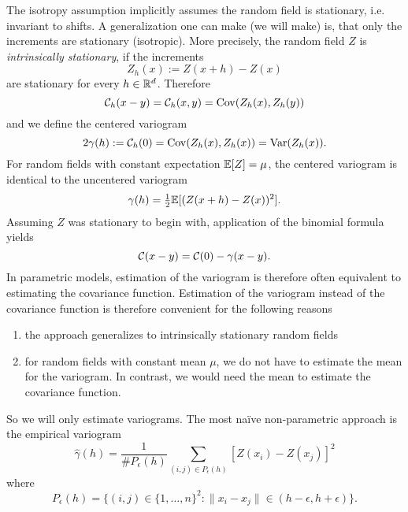 The isotropy assumption implicitly assumes the random field is stationary,
i.e. invariant to shifts. A generalization one can make (we will make)
is, that only the increments are stationary (isotropic). More precisely, the
random field \(Z\) is \emph{intrinsically stationary}, if the increments
\[
	Z_h(x) := Z(x+h) - Z(x)
\]
are stationary for every \(h\in\mathbb{R}^d\). Therefore
\[
	\mathcal{C}_h(x-y) = \mathcal{C}_h(x,y) = \operatorname{Cov}(Z_h(x), Z_h(y))
\]
and we define the centered variogram
\[
	2\gamma(h):= \mathcal{C}_h(0) = \operatorname{Cov}(Z_h(x), Z_h(x))= \operatorname{Var}(Z_h(x)).
\]
For random fields with constant expectation \(\mathbb{E}[Z]=\mu\), the centered
variogram is identical to the uncentered variogram
\[
	\gamma(h) = \tfrac12\mathbb{E}[(Z(x+h)-Z(x))^2].
\]
Assuming \(Z\) was stationary to begin with, application of the binomial formula
yields
\[
	\mathcal{C}(x-y) = \mathcal{C}(0) - \gamma(x-y).
\]
In parametric models, estimation of the variogram is therefore often equivalent
to estimating the covariance function. Estimation of the variogram instead of
the covariance function is therefore convenient for the following reasons
\begin{enumerate}
	\item the approach generalizes to intrinsically stationary random fields
	\item for random fields with constant mean \(\mu\), we do not have to
	estimate the mean for the variogram. In contrast, we would need the mean
	to estimate the covariance function.
\end{enumerate}
So we will only estimate variograms. The most naïve non-parametric approach
is the empirical variogram
\[
	\hat{\gamma}(h) = \frac{1}{\# P_\epsilon(h)}\sum_{(i,j)\in P_\epsilon(h)} [Z(x_i)-Z(x_j)]^2
\]
where
\[
	P_\epsilon(h)
	= \bigl\{
		(i,j)\in \{1,\dots,n\}^2 : \|x_i - x_j\| \in (h-\epsilon, h+\epsilon)
	\bigr\}.
\]